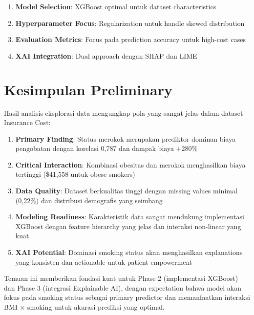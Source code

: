 \begin{enumerate}
    \item \textbf{Model Selection}: XGBoost optimal untuk dataset characteristics
    \item \textbf{Hyperparameter Focus}: Regularization untuk handle skewed distribution
    \item \textbf{Evaluation Metrics}: Focus pada prediction accuracy untuk high-cost cases
    \item \textbf{XAI Integration}: Dual approach dengan SHAP dan LIME
\end{enumerate}

\section{Kesimpulan Preliminary}
\label{sec:kesimpulan-preliminary}

Hasil analisis eksplorasi data mengungkap pola yang sangat jelas dalam dataset Insurance Cost:

\begin{enumerate}
    \item \textbf{Primary Finding}: Status merokok merupakan prediktor dominan biaya pengobatan dengan korelasi 0,787 dan dampak biaya +280\%
    
    \item \textbf{Critical Interaction}: Kombinasi obesitas dan merokok menghasilkan biaya tertinggi (\$41,558 untuk obese smokers)
    
    \item \textbf{Data Quality}: Dataset berkualitas tinggi dengan missing values minimal (0,22\%) dan distribusi demografis yang seimbang
    
    \item \textbf{Modeling Readiness}: Karakteristik data sangat mendukung implementasi XGBoost dengan feature hierarchy yang jelas dan interaksi non-linear yang kuat
    
    \item \textbf{XAI Potential}: Dominasi smoking status akan menghasilkan explanations yang konsisten dan actionable untuk patient empowerment
\end{enumerate}

Temuan ini memberikan fondasi kuat untuk Phase 2 (implementasi XGBoost) dan Phase 3 (integrasi Explainable AI), dengan expectation bahwa model akan fokus pada smoking status sebagai primary predictor dan memanfaatkan interaksi BMI × smoking untuk akurasi prediksi yang optimal.

